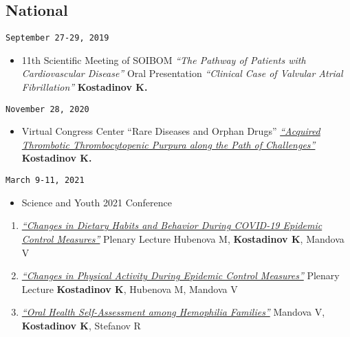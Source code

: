 \documentclass[
  12pt,
  letterpaper,
  DIV=11,
  numbers=noendperiod]{scrartcl}
\providecommand{\tightlist}{%
  \setlength{\itemsep}{0pt}\setlength{\parskip}{0pt}}\usepackage{longtable,booktabs,array}
\begin{document}
\subsection{National}\label{national-1}

\texttt{September\ 27-29,\ 2019}

\begin{itemize}
\tightlist
\item
  11th Scientific Meeting of SOIBOM \textbar{} \emph{``The Pathway of
  Patients with Cardiovascular Disease''} \textbar{} Oral Presentation
  \textbar{} \emph{``Clinical Case of Valvular Atrial Fibrillation''}
  \textbar{} \textbf{Kostadinov K.}
\end{itemize}

\texttt{November\ 28,\ 2020}

\begin{itemize}
\tightlist
\item
  Virtual Congress Center ``Rare Diseases and Orphan Drugs'' \textbar{}
  \href{https://youtu.be/R_UbvDcyTxs}{\emph{``Acquired Thrombotic
  Thrombocytopenic Purpura along the Path of Challenges''}} \textbar{}
  \textbf{Kostadinov K.}
\end{itemize}

\texttt{March\ 9-11,\ 2021}

\begin{itemize}
\tightlist
\item
  Science and Youth 2021 Conference
\end{itemize}

\begin{enumerate}
\def\labelenumi{\arabic{enumi}.}
\item
  \href{https://www.asclepius.bg/images/nm2021/\%D0\%9F\%D0\%A0\%D0\%9E\%D0\%93\%D0\%A0\%D0\%90\%D0\%9C\%D0\%90-\%D0\%9D\%D0\%90\%D0\%A3\%D0\%9A\%D0\%90-\%D0\%98-\%D0\%9C\%D0\%9B\%D0\%90\%D0\%94\%D0\%9E\%D0\%A1\%D0\%A2-2021.pdf}{\emph{``Changes
  in Dietary Habits and Behavior During COVID-19 Epidemic Control
  Measures''}} \textbar{} Plenary Lecture \textbar{} Hubenova M,
  \textbf{Kostadinov K}, Mandova V
\item
  \href{https://www.asclepius.bg/images/nm2021/\%D0\%9F\%D0\%A0\%D0\%9E\%D0\%93\%D0\%A0\%D0\%90\%D0\%9C\%D0\%90-\%D0\%9D\%D0\%90\%D0\%A3\%D0\%9A\%D0\%90-\%D0\%98-\%D0\%9C\%D0\%9B\%D0\%90\%D0\%94\%D0\%9E\%D0\%A1\%D0\%A2-2021.pdf}{\emph{``Changes
  in Physical Activity During Epidemic Control Measures''}} \textbar{}
  Plenary Lecture \textbar{} \textbf{Kostadinov K}, Hubenova M, Mandova
  V
\item
  \href{https://asclepius.bg/cnm/wp-content/uploads/2022/05/Sbornik-Nauka-i-Mladost-2021.pdf}{\emph{``Oral
  Health Self-Assessment among Hemophilia Families''}} \textbar{}
  Mandova V, \textbf{Kostadinov K}, Stefanov R
\end{enumerate}
\end{document}

